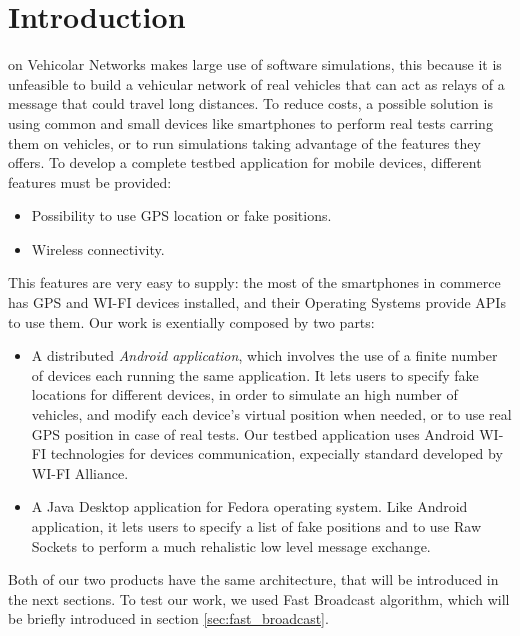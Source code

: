 \section{Introduction}
% 
% 
% 
% 
 on Vehicolar Networks makes large use of software simulations, this because it is unfeasible to build a vehicular network of real vehicles that can act as relays of a message that could travel long distances.
To reduce costs, a possible solution is using common and small devices like smartphones to perform real tests carring them on vehicles, or to run simulations taking advantage of the features they offers.
To develop a complete testbed application for mobile devices, different features must be provided:
\begin{itemize}
	\item Possibility to use GPS location or fake positions.
	\item Wireless connectivity.
\end{itemize}

This features are very easy to supply: the most of the smartphones in commerce has GPS and WI-FI devices installed, and their Operating Systems provide APIs to use them.
Our work is exentially composed by two parts:
\begin{itemize}
	\item A distributed \textit{Android application}, which involves the use of a finite number of devices each running the same application. It lets users to specify fake locations for different devices, in order to simulate an high number of vehicles, and modify each device's virtual position when needed, or to use real GPS position in case of real tests. Our testbed application uses Android WI-FI technologies for devices communication, expecially \direct standard developed by WI-FI Alliance\textsuperscript{\texttrademark}.
	\item A Java Desktop application for Fedora operating system. Like Android application, it lets users to specify a list of fake positions and to use Raw Sockets to perform a much rehalistic low level message exchange. 
\end{itemize}

Both of our two products have the same architecture, that will be introduced in the next sections. To test our work, we used Fast Broadcast algorithm, which will be briefly introduced in section \ref{sec:fast_broadcast}.

